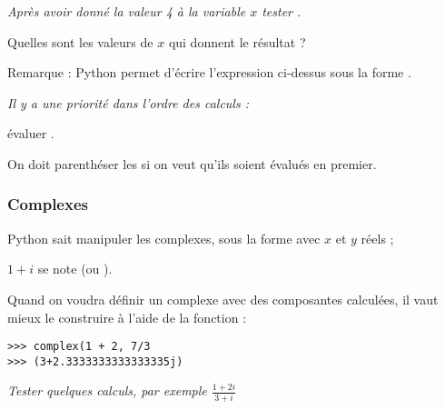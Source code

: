 \begin{Exercise}
{\it Après avoir donné la valeur 4 à la variable $x$ tester .

Quelles sont les valeurs de $x$ qui donnent le résultat  ?}
\end{Exercise}
Remarque : Python permet d'écrire l'expression ci-dessus sous la forme .
\begin{Exercise}
{\it Il y a une priorité dans l'ordre des calculs :

évaluer .

On doit parenthéser les  si on veut qu'ils soient évalués en premier.
}
\end{Exercise}
\subsubsection{Complexes}
Python sait manipuler les complexes, sous la forme  avec $x$ et $y$ réels ; 

$1+i$ se note  (ou ).

Quand on voudra définir un complexe avec des composantes calculées, il vaut mieux le construire à l'aide de la fonction  : 
\begin{lstlisting}
>>> complex(1 + 2, 7/3
>>> (3+2.3333333333333335j)
\end{lstlisting}
\begin{Exercise}
{\it Tester quelques calculs, par exemple $\frac{1+2i}{3+i}$}
\end{Exercise}

